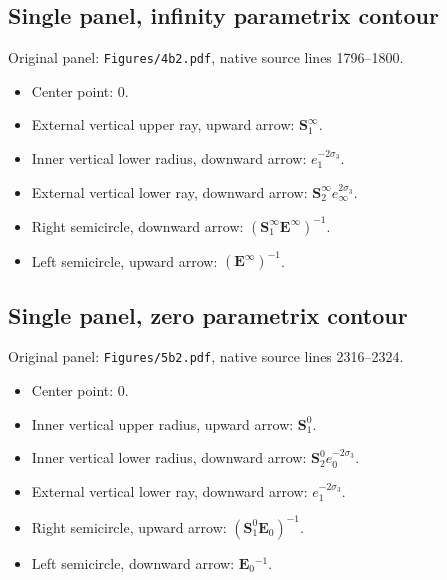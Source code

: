 \subsection*{Single panel, infinity parametrix contour}
\noindent Original panel: \texttt{Figures/4b2.pdf}, native source lines 1796--1800.
\begin{itemize}\itemsep=0pt
\item Center point: $0$.
\item External vertical upper ray, upward arrow: $\mathbf{S}_1^\infty{}$.
\item Inner vertical lower radius, downward arrow: $e_1^{-2\sigma_3}$.
\item External vertical lower ray, downward arrow: $\mathbf{S}_2^\infty{}e_\infty^{2\sigma_3}$.
\item Right semicircle, downward arrow: $(\mathbf{S}_1^\infty{}\mathbf{E}^\infty{})^{-1}$.
\item Left semicircle, upward arrow: $(\mathbf{E}^\infty{})^{-1}$.
\end{itemize}

\subsection*{Single panel, zero parametrix contour}
\noindent Original panel: \texttt{Figures/5b2.pdf}, native source lines 2316--2324.
\begin{itemize}\itemsep=0pt
\item Center point: $0$.
\item Inner vertical upper radius, upward arrow: $\mathbf{S}_1^0{}$.
\item Inner vertical lower radius, downward arrow: $\mathbf{S}_2^0{}e_0^{-2\sigma_3}$.
\item External vertical lower ray, downward arrow: $e_1^{-2\sigma_3}$.
\item Right semicircle, upward arrow: $(\mathbf{S}_1^0{}\mathbf{E}_0{})^{-1}$.
\item Left semicircle, downward arrow: $\mathbf{E}_0{}^{-1}$.
\end{itemize}

